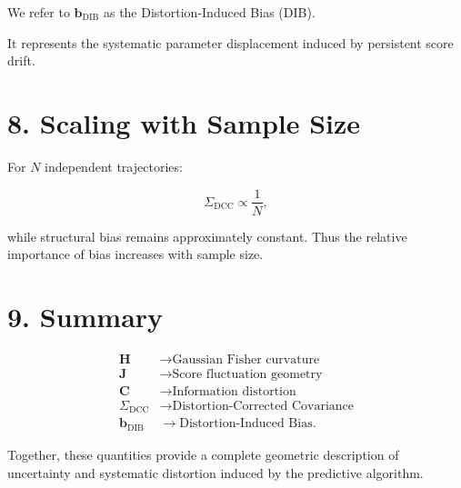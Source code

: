 \documentclass[11pt]{article}
\begin{document}
We refer to $\mathbf b_{\mathrm{DIB}}$ as the Distortion-Induced Bias (DIB).

It represents the systematic parameter displacement induced by persistent score drift.

\section*{8. Scaling with Sample Size}

For $N$ independent trajectories:

\begin{equation}
\Sigma_{\mathrm{DCC}} \propto \frac{1}{N},
\end{equation}

while structural bias remains approximately constant.
Thus the relative importance of bias increases with sample size.

\section*{9. Summary}

\begin{align}
\mathbf H &\rightarrow \text{Gaussian Fisher curvature} \\
\mathbf J &\rightarrow \text{Score fluctuation geometry} \\
\mathbf C &\rightarrow \text{Information distortion} \\
\Sigma_{\mathrm{DCC}} &\rightarrow \text{Distortion-Corrected Covariance} \\
\mathbf b_{\mathrm{DIB}} &\rightarrow \text{Distortion-Induced Bias}.
\end{align}

Together, these quantities provide a complete geometric description of
uncertainty and systematic distortion induced by the predictive algorithm.
\end{document}
